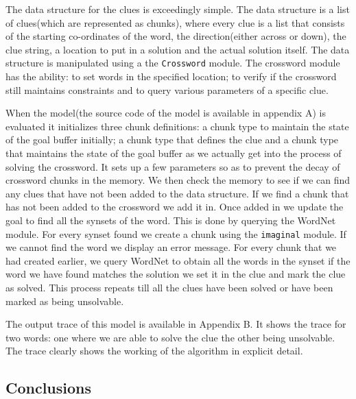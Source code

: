 The data structure for the clues is exceedingly simple. The data
structure is a list of clues(which are represented as chunks), where
every clue is a list that consists of the starting co-ordinates of the
word, the direction(either across or down), the clue string, a
location to put in a solution and the actual solution itself. The data
structure is manipulated using a the \texttt{Crossword} module. The
crossword module has the ability: to set words in the specified
location; to verify if the crossword still maintains constraints and
to query various parameters of a specific clue.

When the model(the source code of the model is available in appendix
A) is evaluated it initializes three chunk definitions: a chunk type
to maintain the state of the goal buffer initially; a chunk type that
defines the clue and a chunk type that maintains the state of the goal
buffer as we actually get into the process of solving the
crossword. It sets up a few parameters so as to prevent the decay of
crossword chunks in the memory. We then check the memory to see if we
can find any clues that have not been added to the data structure. If
we find a chunk that has not been added to the crossword we add it
in. Once added in we update the goal to find all the synsets of the
word. This is done by querying the WordNet module. For every synset
found we create a chunk using the \texttt{imaginal} module. If we
cannot find the word we display an error message. For every chunk that
we had created earlier, we query WordNet to obtain all the words
in the synset if the word we have found matches the solution we set it
in the clue and mark the clue as solved. This process repeats till all
the clues have been solved or have been marked as being unsolvable.

The output trace of this model is available in Appendix B. It shows
the trace for two words: one where we are able to solve the clue the
other being unsolvable. The trace clearly shows the working of the
algorithm in explicit detail.

\subsection{Conclusions}

